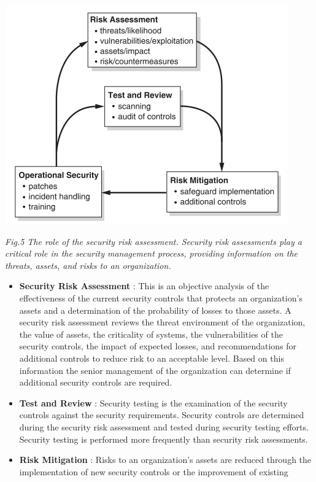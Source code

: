 \documentclass[twosided,a4,10pt]{article}
\begin{document}
\begin{multicols}{2}
\includegraphics[scale=0.65]{security_management}
\begin{center}
	\textit{Fig.5 The role of the security risk assessment. Security risk assessments play a critical role in the security management process, providing information on the threats, assets, and risks to an organization.}
\end{center}
\begin{itemize}
    \item \textbf{Security Risk Assessment} : This is an objective analysis of the effectiveness of the current security controls that protects an organization’s assets and a
    determination of the probability of losses to those assets. A security risk
    assessment reviews the threat environment of the organization, the value of
    assets, the criticality of systems, the vulnerabilities of the security controls,
    the impact of expected losses, and recommendations for additional controls
    to reduce risk to an acceptable level. Based on this information the senior
    management of the organization can determine if additional security
    controls are required.
    \item \textbf{Test and Review} : Security testing is the examination of the security
    controls against the security requirements. Security controls are determined
    during the security risk assessment and tested during security testing efforts.
    Security testing is performed more frequently than security risk assessments.
    \item \textbf{Risk Mitigation} : Risks to an organization’s assets are reduced through
    the implementation of new security controls or the improvement of existing

\end{itemize}
\end{multicols}
\end{document}
